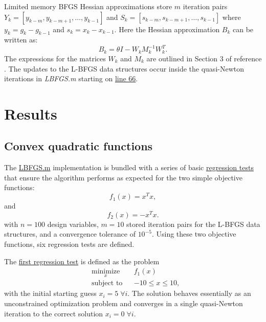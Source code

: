 \documentclass[11pt]{article}
\begin{document}
Limited memory BFGS Hessian approximations store $m$ iteration
pairs $Y_k = [y_{k-m}, y_{k-m+1}, \dots, y_{k-1}]$ and
$S_k = [s_{k-m}, s_{k-m+1}, \dots, s_{k-1}]$ where
$y_k = g_k - g_{k-1}$ and $s_k = x_k - x_{k-1}$. Here the
Hessian approximation $B_k$ can be written as:
%
\begin{equation}
B_k = \theta I - W_k M^{-1}_k W^T_k.
\end{equation}
%
The expressions for the matrices $W_k$ and $M_k$ are
outlined in Section 3 of reference \cite{lbfgsb}. The updates
to the L-BFGS data structures occur inside the quasi-Newton
iterations in \emph{LBFGS.m} starting on
\href{https://github.com/bgranzow/L-BFGS-B/blob/master/LBFGSB.m#L66}{line 66}.

\section{Results}

\subsection{Convex quadratic functions}

The \href{https://github.com/bgranzow/L-BFGS-B/blob/master/test_LBFGSB.m}
{LBFGS.m} implementation is bundled with a series of basic
\href{https://github.com/bgranzow/L-BFGS-B/blob/master/test_LBFGSB.m}
{regression tests} that ensure the algorithm performs as
expected for the two simple objective functions:
%
\begin{equation}
f_1(x) = x^T x,
\end{equation}
and
\begin{equation}
f_2(x) = - x^T x.
\end{equation}
%
with $n = 100$ design variables, $m=10$ stored iteration
pairs for the L-BFGS data structures, and a convergence
tolerance of $10^{-5}$. Using these two objective
functions, six regression tests are defined.

The
\href{https://github.com/bgranzow/L-BFGS-B/blob/master/test_LBFGSB.m#L10}
{first regression test} is defined as the problem
%
\begin{equation}
\begin{aligned}
& \underset{x}{\text{minimize}}
& & f_1(x) \\
& \text{subject to}
& & -10 \leq x \leq 10,
\end{aligned}
\end{equation}
%
with the initial starting guess $x_i = 5 \; \forall i$.
The solution behaves essentially as an unconstrained
optimization problem and converges in a single quasi-Newton
iteration to the correct solution
$x_i = 0 \; \forall i$.
\end{document}
